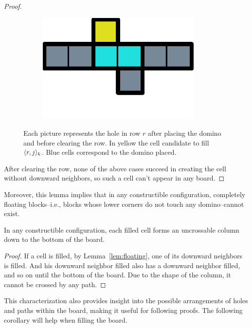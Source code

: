 \begin{proof}
\begin{figure}[ht]
\begin{subfigure}[b]{0.15\textwidth}
    \caption{}
    \label{floating:f}
  \end{subfigure}
  \begin{subfigure}[b]{0.15\textwidth}
    \centering
    \includegraphics[width=0.9\textwidth]{./pictures/dominoes/proff-floating/scenario-7.pdf}
    \caption{}
    \label{floating:g}
  \end{subfigure}
  \caption{Each picture represents the hole in row $r$ after placing the domino and before clearing the row. In yellow the cell candidate to fill $\cell[r]_k$. Blue cells correspond to the domino placed.}
\end{figure}

After clearing the row, none of the above cases succeed in creating the cell without downward neighbors, so such a cell can't appear in any board.
\end{proof}

Moreover, this lemma implies that in any constructible configuration, completely floating blocks--i.e., blocks whose lower corners do not touch any domino--cannot exist. 

\begin{corollary0}
  In any constructible configuration, each filled cell forms an uncrossable column down to the bottom of the board.
\end{corollary0}
\begin{proof}
  If a cell is filled, by Lemma~\ref{lem:floating}, one of its downward neighbors is filled. And his downward neighbor filled also has a downward neighbor filled, and so on until the bottom of the board. Due to the shape of the column, it cannot be crossed by any path.
\end{proof}

This characterization also provides insight into the possible arrangements of holes and paths within the board, making it useful for following proofs. The following corollary will help when filling the board. 

